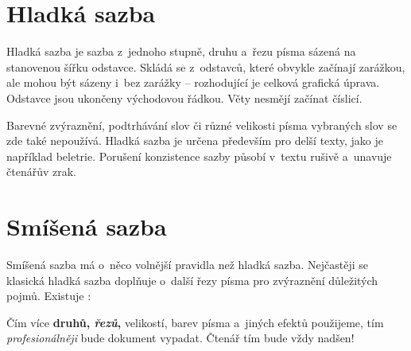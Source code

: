 \documentclass[a4paper, 11pt, twocolumn]{article}
\begin{document}

	\section{Hladká sazba}

	Hladká sazba je sazba z~jednoho stupně, druhu a~řezu písma sázená na stanovenou šířku odstavce. Skládá se z~odstavců, které obvykle začínají zarážkou, ale mohou být sázeny i~bez zarážky -- rozhodující je celková grafická úprava. Odstavce jsou ukončeny východovou řádkou. Věty nesmějí začínat číslicí.

	Barevné zvýraznění, podtrhávání slov či různé velikosti písma vybraných slov se zde také nepoužívá. Hladká sazba je určena především pro delší texty, jako je například beletrie. Porušení konzistence sazby působí v~textu rušivě a~unavuje čtenářův zrak.

	\section{Smíšená sazba}

	Smíšená sazba má o~něco volnější pravidla než hladká sazba. Nejčastěji se klasická hladká sazba doplňuje o~další řezy písma pro zvýraznění důležitých pojmů. Existuje :

	\begin{adjustwidth}{0.77cm}{0.88cm}
		\medskip
		\setlength{\parindent}{0.5cm}
		\hspace{\parindent}
		Čím více \textbf{druhů, \textit{řezů},} {\scriptsize velikostí}, barev pí\-sma a~jiných efektů použijeme, tím \textit{profesionálněji} bude dokument vypadat. Čtenář tím bude vždy {\Huge nadšen!}
		\medskip
	\end{adjustwidth}
\end{document}
